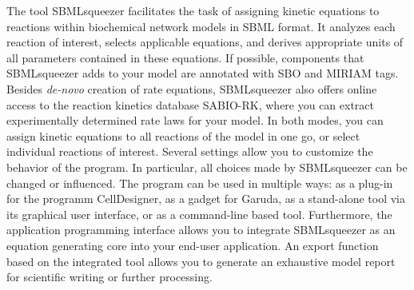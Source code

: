 The tool SBMLsqueezer facilitates the task of assigning kinetic equations to
reactions within biochemical network models in SBML format.
It analyzes each reaction of interest, selects applicable equations, and derives
appropriate units of all parameters contained in these equations.
If possible, components that SBMLsqueezer adds to your model are annotated with
SBO and MIRIAM tags.
Besides \emph{de-novo} creation of rate equations, SBMLsqueezer also offers
online access to the reaction kinetics database SABIO-RK, where you can extract
experimentally determined rate laws for your model.
In both modes, you can assign kinetic equations to all reactions of the model in
one go, or select individual reactions of interest. 
Several settings allow you to customize the behavior of the program.
In particular, all choices made by SBMLsqueezer can be changed or influenced.
The program can be used in multiple ways: as a plug-in for the programm
CellDesigner, as a gadget for Garuda, as a stand-alone tool via its graphical
user interface, or as a command-line based tool.
Furthermore, the application programming interface allows you to integrate
SBMLsqueezer as an equation generating core into your end-user application.
An export function based on the integrated tool \SBMLLaTeX{} allows you to
generate an exhaustive model report for scientific writing or further
processing.
